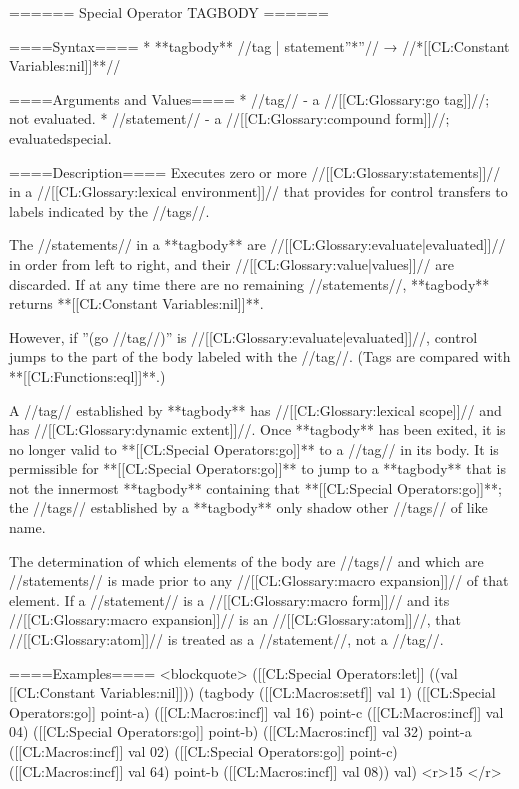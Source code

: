 ====== Special Operator TAGBODY ======

====Syntax====
  * **tagbody** //{tag | statement}''*''// → //*[[CL:Constant Variables:nil]]**//

====Arguments and Values====
  * //tag// - a //[[CL:Glossary:go tag]]//; not evaluated.
  * //statement// - a //[[CL:Glossary:compound form]]//; evaluatedspecial.

====Description====
Executes zero or more //[[CL:Glossary:statements]]// in a //[[CL:Glossary:lexical environment]]// that provides for control transfers to labels indicated by the //tags//.

The //statements// in a **tagbody** are //[[CL:Glossary:evaluate|evaluated]]// in order from left to right, and their //[[CL:Glossary:value|values]]// are discarded. If at any time there are no remaining //statements//, **tagbody** returns **[[CL:Constant Variables:nil]]**.

However, if ''(go //tag//)'' is //[[CL:Glossary:evaluate|evaluated]]//, control jumps to the part of the body labeled with the //tag//. (Tags are compared with **[[CL:Functions:eql]]**.)

A //tag// established by **tagbody** has //[[CL:Glossary:lexical scope]]// and has //[[CL:Glossary:dynamic extent]]//. Once **tagbody** has been exited, it is no longer valid to **[[CL:Special Operators:go]]** to a //tag// in its body. It is permissible for **[[CL:Special Operators:go]]** to jump to a **tagbody** that is not the innermost **tagbody** containing that **[[CL:Special Operators:go]]**; the //tags// established by a **tagbody** only shadow other //tags// of like name.

The determination of which elements of the body are //tags// and which are //statements// is made prior to any //[[CL:Glossary:macro expansion]]// of that element. If a //statement// is a //[[CL:Glossary:macro form]]// and its //[[CL:Glossary:macro expansion]]// is an //[[CL:Glossary:atom]]//, that //[[CL:Glossary:atom]]// is treated as a //statement//, not a //tag//.

====Examples====
<blockquote> 
([[CL:Special Operators:let]] ((val [[CL:Constant Variables:nil]]))
  (tagbody
     ([[CL:Macros:setf]] val 1)
     ([[CL:Special Operators:go]] point-a)
     ([[CL:Macros:incf]] val 16)
   point-c
     ([[CL:Macros:incf]] val 04)
     ([[CL:Special Operators:go]] point-b)
     ([[CL:Macros:incf]] val 32)
   point-a
     ([[CL:Macros:incf]] val 02)
     ([[CL:Special Operators:go]] point-c)
     ([[CL:Macros:incf]] val 64)
   point-b
     ([[CL:Macros:incf]] val 08))
  val) <r>15 </r>
  
